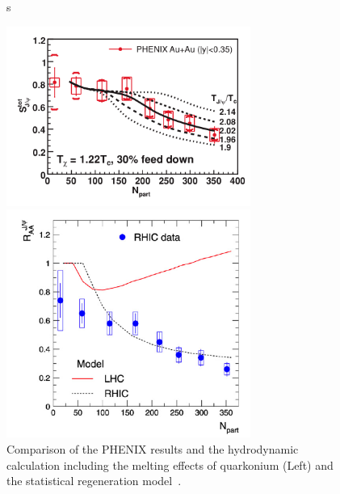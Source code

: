 \begin{figure}[!h]
  \begin{minipage}{0.5\hsize}s
    \begin{center}
      \includegraphics[width=8cm]{chap2/figure/experimentaldata/gunjicalc.png}
    \end{center}
  \end{minipage}
  \begin{minipage}{0.5\hsize}
    \begin{center}
      \includegraphics[width=8cm]{chap2/figure/experimentaldata/pbmreco.png}
    \end{center}
  \end{minipage}
  \caption{
	Comparison of the PHENIX results and the hydrodynamic calculation including the  melting effects of quarkonium (Left) and the statistical regeneration model~\cite{bib_gunjicalc,bib_recomodel}.
   }
  \label{fig_2_lhc_gunjicalc}
\end{figure}



